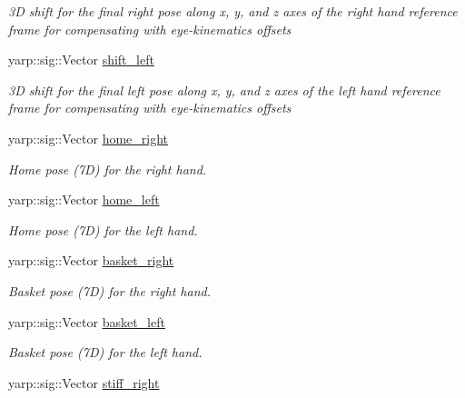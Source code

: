 \begin{DoxyCompactItemize}
\begin{DoxyCompactList}\small\item\em 3D shift for the final right pose along x, y, and z axes of the right hand reference frame for compensating with eye-\/kinematics offsets \end{DoxyCompactList}\item 
yarp\+::sig\+::\+Vector \hyperlink{classGraspingModule_a96feca3ff9d44e599351ddb1c4497fcf}{shift\+\_\+left}\label{classGraspingModule_a96feca3ff9d44e599351ddb1c4497fcf}

\begin{DoxyCompactList}\small\item\em 3D shift for the final left pose along x, y, and z axes of the left hand reference frame for compensating with eye-\/kinematics offsets \end{DoxyCompactList}\item 
yarp\+::sig\+::\+Vector \hyperlink{classGraspingModule_ac43f827abab558d8aea39a6cbcd150a2}{home\+\_\+right}\label{classGraspingModule_ac43f827abab558d8aea39a6cbcd150a2}

\begin{DoxyCompactList}\small\item\em Home pose (7D) for the right hand. \end{DoxyCompactList}\item 
yarp\+::sig\+::\+Vector \hyperlink{classGraspingModule_a75a4689473261072a85c67c76ac6567f}{home\+\_\+left}\label{classGraspingModule_a75a4689473261072a85c67c76ac6567f}

\begin{DoxyCompactList}\small\item\em Home pose (7D) for the left hand. \end{DoxyCompactList}\item 
yarp\+::sig\+::\+Vector \hyperlink{classGraspingModule_a514ee9d4045d3e551a089ffd1f296c49}{basket\+\_\+right}\label{classGraspingModule_a514ee9d4045d3e551a089ffd1f296c49}

\begin{DoxyCompactList}\small\item\em Basket pose (7D) for the right hand. \end{DoxyCompactList}\item 
yarp\+::sig\+::\+Vector \hyperlink{classGraspingModule_a4c2cf37b608df9bdce4ff5a2882111ef}{basket\+\_\+left}\label{classGraspingModule_a4c2cf37b608df9bdce4ff5a2882111ef}

\begin{DoxyCompactList}\small\item\em Basket pose (7D) for the left hand. \end{DoxyCompactList}\item 
yarp\+::sig\+::\+Vector \hyperlink{classGraspingModule_af25aefd74e3a455cd3288896dc7f545e}{stiff\+\_\+right}\label{classGraspingModule_af25aefd74e3a455cd3288896dc7f545e}


\end{DoxyCompactItemize}
